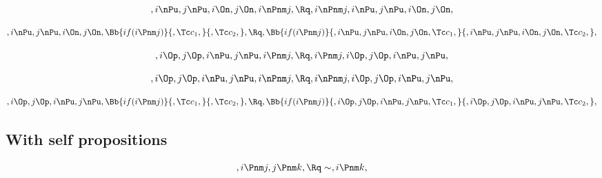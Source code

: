 \[, i \nPu, j \nPu, i \On, j \On, i \nPnm j, \Rq , i \nPnm j, i \nPu, j \nPu, i \On, j \On, \]

\bigskip
\bigskip

\[, i \nPu, j \nPu, i \On, j \On, \Bb{if(i \Pnm j)}{,\Tc c_1,}{,\Tc c_2,}, \Rq ,\Bb{if(i \Pnm j)}{, i \nPu, j \nPu, i \On, j \On,\Tc c_1,}{, i \nPu, j \nPu, i \On, j \On, \Tc c_2,}, \]

\bigskip
\bigskip
\bigskip
\bigskip





\[, i \Op, j \Op, i \nPu, j \nPu, i \Pnm j, \Rq , i \Pnm j, i \Op, j \Op, i \nPu, j \nPu, \]




\[,i \Op, j \Op, i \nPu, j \nPu, i \nPnm j, \Rq , i \nPnm j,i \Op, j \Op, i \nPu, j \nPu, \]

\bigskip
\bigskip

\[,i \Op, j \Op, i \nPu, j \nPu, \Bb{if(i \Pnm j)}{,\Tc c_1,}{,\Tc c_2,}, \Rq ,\Bb{if(i \Pnm j)}{, i \Op, j \Op, i \nPu, j \nPu,\Tc c_1,}{,i \Op, j \Op, i \nPu, j \nPu, \Tc c_2,}, \]

\bigskip
\bigskip
\bigskip
\bigskip





\bigskip
\bigskip
\bigskip
\bigskip
\subsection{ With self propositions}
\[, i \Pnm j, j \Pnm k, \Rq \sim, i \Pnm k, \]

